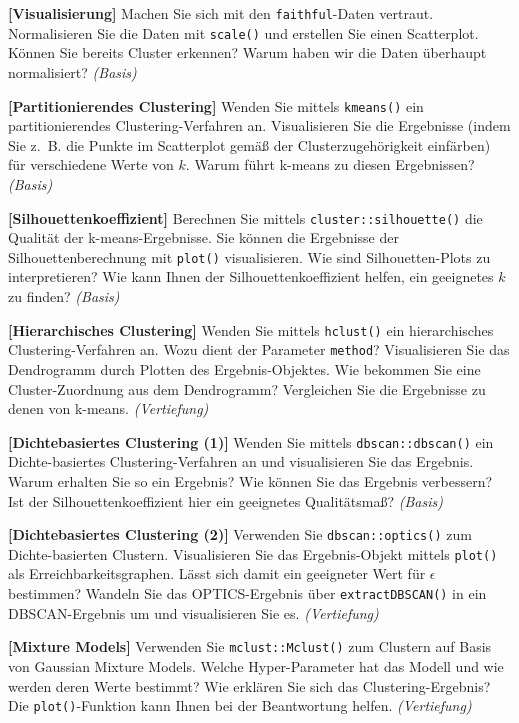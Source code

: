 \documentclass[headinclude,headsepline]{scrartcl}
\newcommand{\taskcategory}[1]{{\color[HTML]{800000}\emph{(#1)}}}
\newcommand{\taskname}[1]{\textbf{[#1]}}
\newcommand{\code}[1]{{\color[HTML]{000080}\texttt{#1}}}
\begin{document}
\vspace{10pt}
\begin{compactenum}[a)]\itemsep10pt
	\item
	\taskname{Visualisierung}
	Machen Sie sich mit den \code{faithful}-Daten vertraut.
	Normalisieren Sie die Daten mit \code{scale()} und erstellen Sie einen Scatterplot.
	Können Sie bereits Cluster erkennen?
	Warum haben wir die Daten überhaupt normalisiert?
	\taskcategory{Basis}
	\item
	\taskname{Partitionierendes Clustering}
	Wenden Sie mittels \code{kmeans()} ein partitionierendes Clustering-Verfahren an.
	Visualisieren Sie die Ergebnisse (indem Sie z.~B. die Punkte im Scatterplot gemäß der Clusterzugehörigkeit einfärben) für verschiedene Werte von $k$.
	Warum führt k-means zu diesen Ergebnissen?
	\taskcategory{Basis}
	\item
	\taskname{Silhouettenkoeffizient}
	Berechnen Sie mittels \code{cluster::silhouette()} die Qualität der k-means-Ergebnisse.
	Sie können die Ergebnisse der Silhouettenberechnung mit \code{plot()} visualisieren.
	Wie sind Silhouetten-Plots zu interpretieren?
	Wie kann Ihnen der Silhouettenkoeffizient helfen, ein geeignetes $k$ zu finden?
	\taskcategory{Basis}
	\item
	\taskname{Hierarchisches Clustering}
	Wenden Sie mittels \code{hclust()} ein hierarchisches Cluste\-ring-Verfahren an.
	Wozu dient der Parameter \code{method}?
	Visualisieren Sie das Dendrogramm durch Plotten des Ergebnis-Objektes.
	Wie bekommen Sie eine Cluster-Zuordnung aus dem Dendrogramm?
	Vergleichen Sie die Ergebnisse zu denen von k-means.
	\taskcategory{Vertiefung}
	\item
	\taskname{Dichtebasiertes Clustering (1)}
	Wenden Sie mittels \code{dbscan::dbscan()} ein Dichte-basiertes Clustering-Verfahren an und visualisieren Sie das Ergebnis.
	Warum erhalten Sie so ein Ergebnis?
	Wie können Sie das Ergebnis verbessern?
	Ist der Silhouettenkoeffizient hier ein geeignetes Qualitätsmaß?
	\taskcategory{Basis}
	\item
	\taskname{Dichtebasiertes Clustering (2)}
	Verwenden Sie \code{dbscan::optics()} zum Dichte-basierten Clustern.
	Visualisieren Sie das Ergebnis-Objekt mittels \code{plot()} als Erreichbarkeitsgraphen.
	Lässt sich damit ein geeigneter Wert für $\epsilon$ bestimmen?
	Wandeln Sie das OPTICS-Ergebnis über \code{extractDBSCAN()} in ein DBSCAN-Ergebnis um und visualisieren Sie es.
	\taskcategory{Vertiefung}
	\item
	\taskname{Mixture Models}
	Verwenden Sie \code{mclust::Mclust()} zum Clustern auf Basis von Gaussian Mixture Models.
	Welche Hyper-Parameter hat das Modell und wie werden deren Werte bestimmt?
	Wie erklären Sie sich das Clustering-Ergebnis?
	Die \code{plot()}-Funktion kann Ihnen bei der Beantwortung helfen.
	\taskcategory{Vertiefung}
\end{compactenum}
\end{document}
